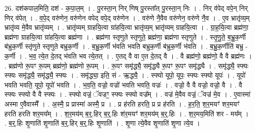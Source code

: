 \documentclass[17pt]{extarticle}
\begin{document}
26. दश॑कपाल॒मिति॒ दश॑ - क॒पा॒ल॒म् । . पु॒रस्ता॒न् निर् णिष् पु॒रस्ता᳚त् पु॒रस्ता॒न् निः । . निर् व॑पेद् वपे॒न् निर् णिर् व॑पेत् । . व॒पे॒द् वरु॑णेन॒ वरु॑णेन वपेद् वपे॒द् वरु॑णेन । . वरु॑णे नै॒वैव वरु॑णेन॒ वरु॑णे नै॒व । . ए॒व भ्रातृ॑व्य॒म् भ्रातृ॑व्य मे॒वैव भ्रातृ॑व्यम् । . भ्रातृ॑व्यम् ग्राहयि॒त्वा ग्रा॑हयि॒त्वा भ्रातृ॑व्य॒म् भ्रातृ॑व्यम् ग्राहयि॒त्वा । . ग्रा॒ह॒यि॒त्वा ब्रह्म॑णा॒ ब्रह्म॑णा ग्राहयि॒त्वा ग्रा॑हयि॒त्वा ब्रह्म॑णा । . ब्रह्म॑णा स्तृणुते स्तृणुते॒ ब्रह्म॑णा॒ ब्रह्म॑णा स्तृणुते । . स्तृ॒णु॒ते॒ ब॒भ्रु॒क॒र्णी ब॑भ्रुक॒र्णी स्तृ॑णुते स्तृणुते बभ्रुक॒र्णी । . ब॒भ्रु॒क॒र्णी भ॑वति भवति बभ्रुक॒र्णी ब॑भ्रुक॒र्णी भ॑वति । . ब॒भ्रु॒क॒र्णीति॑ बभ्रु - क॒र्णी । . भ॒व॒ त्ये॒त दे॒तद् भ॑वति भव त्ये॒तत् । . ए॒तद् वै वा ए॒त दे॒तद् वै । . वै ब्रह्म॑णो॒ ब्रह्म॑णो॒ वै वै ब्रह्म॑णः । . ब्रह्म॑णो रू॒पꣳ रू॒पम् ब्रह्म॑णो॒ ब्रह्म॑णो रू॒पम् । . रू॒पꣳ समृ॑द्ध्यै॒ समृ॑द्ध्यै रू॒पꣳ रू॒पꣳ समृ॑द्ध्यै । . समृ॑द्ध्यै॒ स्फ्यः स्फ्यः समृ॑द्ध्यै॒ समृ॑द्ध्यै॒ स्फ्यः । . समृ॑द्ध्या॒ इति॒ सं - ऋ॒द्ध्यै॒ । . स्फ्यो यूपो॒ यूपः॒ स्फ्यः स्फ्यो यूपः॑ । . यूपो॑ भवति भवति॒ यूपो॒ यूपो॑ भवति । . भ॒व॒ति॒ वज्रो॒ वज्रो॑ भवति भवति॒ वज्रः॑ । . वज्रो॒ वै वै वज्रो॒ वज्रो॒ वै । . वै स्फ्यः स्फ्यो वै वै स्फ्यः । . स्फ्यो वज्रं॒ ॅवज्रꣳ॒॒ स्फ्यः स्फ्यो वज्र᳚म् । . वज्र॑ मे॒वैव वज्रं॒ ॅवज्र॑ मे॒व । . ए॒वास्मा॑ अस्मा ए॒वैवास्मै᳚ । . अ॒स्मै॒ प्र प्रास्मा॑ अस्मै॒ प्र । . प्र ह॑रति हरति॒ प्र प्र ह॑रति । . ह॒र॒ति॒ श॒र॒मयꣳ॑ शर॒मयꣳ॑ हरति हरति शर॒मय᳚म् । . श॒र॒मय॑म् ब॒र्॒.हिर् ब॒र्॒.हिः श॑र॒मयꣳ॑ शर॒मय॑म् ब॒र्॒.हिः । . श॒र॒मय॒मिति॑ शर - मय᳚म् । . ब॒र्॒.हिः शृ॒णाति॑ शृ॒णाति॑ ब॒र्॒.हिर् ब॒र्॒.हिः शृ॒णाति॑ । . शृ॒णा त्ये॒वैव शृ॒णाति॑ शृ॒णा त्ये॒व । \newline
\end{document}
